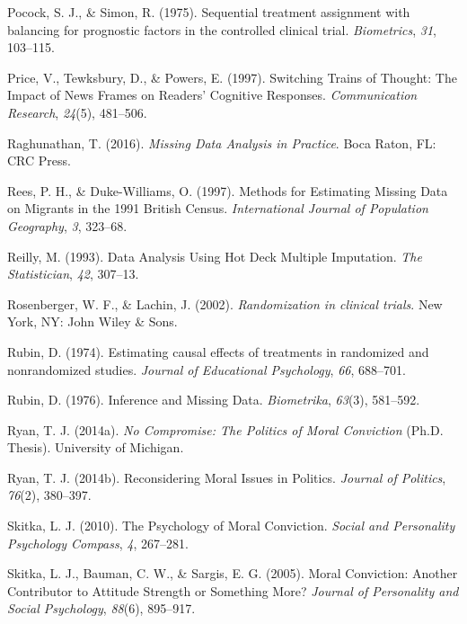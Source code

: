 \documentclass[12pt,econ]{sources/authesis}
\begin{document}
\leavevmode\hypertarget{ref-pocock_1975_sequential}{}%
Pocock, S. J., \& Simon, R. (1975). Sequential treatment assignment with balancing for prognostic factors in the controlled clinical trial. \emph{Biometrics}, \emph{31}, 103--115.

\leavevmode\hypertarget{ref-price_switching_1997}{}%
Price, V., Tewksbury, D., \& Powers, E. (1997). Switching Trains of Thought: The Impact of News Frames on Readers' Cognitive Responses. \emph{Communication Research}, \emph{24}(5), 481--506.

\leavevmode\hypertarget{ref-raghunathan_2016_missing}{}%
Raghunathan, T. (2016). \emph{Missing Data Analysis in Practice}. Boca Raton, FL: CRC Press.

\leavevmode\hypertarget{ref-rees_1997_methods}{}%
Rees, P. H., \& Duke-Williams, O. (1997). Methods for Estimating Missing Data on Migrants in the 1991 British Census. \emph{International Journal of Population Geography}, \emph{3}, 323--68.

\leavevmode\hypertarget{ref-reilly_1993_data}{}%
Reilly, M. (1993). Data Analysis Using Hot Deck Multiple Imputation. \emph{The Statistician}, \emph{42}, 307--13.

\leavevmode\hypertarget{ref-rosenberger_2002_randomization}{}%
Rosenberger, W. F., \& Lachin, J. (2002). \emph{Randomization in clinical trials}. New York, NY: John Wiley \& Sons.

\leavevmode\hypertarget{ref-rubin_1974_estimating}{}%
Rubin, D. (1974). Estimating causal effects of treatments in randomized and nonrandomized studies. \emph{Journal of Educational Psychology}, \emph{66}, 688--701.

\leavevmode\hypertarget{ref-rubin_1976_inference}{}%
Rubin, D. (1976). Inference and Missing Data. \emph{Biometrika}, \emph{63}(3), 581--592.

\leavevmode\hypertarget{ref-ryan_no_2014}{}%
Ryan, T. J. (2014a). \emph{No Compromise: The Politics of Moral Conviction} (Ph.D. Thesis). University of Michigan.

\leavevmode\hypertarget{ref-ryan_reconsidering_2014}{}%
Ryan, T. J. (2014b). Reconsidering Moral Issues in Politics. \emph{Journal of Politics}, \emph{76}(2), 380--397.

\leavevmode\hypertarget{ref-skitka_psychology_2010}{}%
Skitka, L. J. (2010). The Psychology of Moral Conviction. \emph{Social and Personality Psychology Compass}, \emph{4}, 267--281.

\leavevmode\hypertarget{ref-skitka_moral_2005}{}%
Skitka, L. J., Bauman, C. W., \& Sargis, E. G. (2005). Moral Conviction: Another Contributor to Attitude Strength or Something More? \emph{Journal of Personality and Social Psychology}, \emph{88}(6), 895--917.
\end{document}
